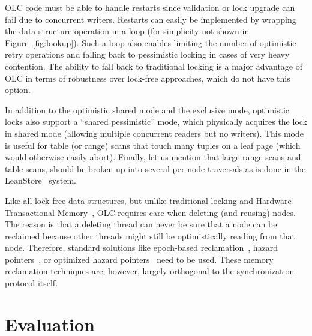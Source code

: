 \documentclass[11pt]{article}
\begin{document}
OLC code must be able to handle restarts since validation or lock upgrade can fail due to concurrent writers.
Restarts can easily be implemented by wrapping the data structure operation in a loop (for simplicity not shown in Figure~\ref{fig:lookup}).
Such a loop also enables limiting the number of optimistic retry operations and falling back to pessimistic locking in cases of very heavy contention.
The ability to fall back to traditional locking is a major advantage of OLC in terms of robustness over lock-free approaches, which do not have this option.

In addition to the optimistic shared mode and the exclusive mode, optimistic locks also support a ``shared pessimistic'' mode, which physically acquires the lock in shared mode (allowing multiple concurrent readers but no writers).
This mode is useful for table (or range) scans that touch many tuples on a leaf page (which would otherwise easily abort).
Finally, let us mention that large range scans and table scans, should be broken up into several per-node traversals as is done in the LeanStore~\cite{leanstore} system.

Like all lock-free data structures, but unlike traditional locking and Hardware Transactional Memory~\cite{DBLP:conf/hpca/KarnagelDRLLSL14,DBLP:journals/pvldb/MakreshanskiLS15,htmtkde}, OLC requires care when deleting (and reusing) nodes.
The reason is that a deleting thread can never be sure that a node can be reclaimed because other threads might still be optimistically reading from that node.
Therefore, standard solutions like epoch-based reclamation~\cite{DBLP:conf/sosp/TuZKLM13}, hazard pointers~\cite{DBLP:journals/tpds/Michael04}, or optimized hazard pointers~\cite{DBLP:conf/spaa/BalmauGHZ16} need to be used.
These memory reclamation techniques are, however, largely orthogonal to the synchronization protocol itself.


\newpage
\section{Evaluation}\label{sec:evaluation}
\end{document}
